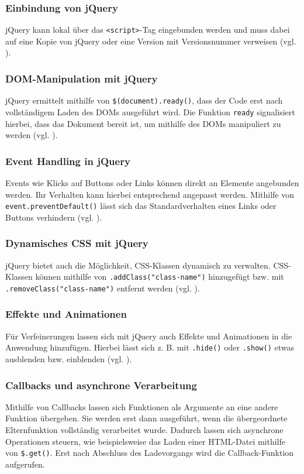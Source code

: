 \documentclass[oneside]{ausarbeitung}
\begin{document}
\subsubsection{Einbindung von jQuery}
jQuery kann lokal über das \texttt{\textless script\textgreater}-Tag eingebunden werden und muss dabei auf eine Kopie von jQuery oder eine Version mit Versionsnummer verweisen (vgl. \parencite{jquery_api}).  

\subsubsection{DOM-Manipulation mit jQuery}
jQuery ermittelt mithilfe von \texttt{\$(document).ready()}, dass der Code erst nach vollständigem Laden des DOMs ausgeführt wird. Die Funktion \texttt{ready} signalisiert hierbei, dass das Dokument bereit ist, um mithilfe des DOMs manipuliert zu werden (vgl. \parencite{jquery_api}).  

\subsubsection{Event Handling in jQuery}
Events wie Klicks auf Buttons oder Links können direkt an Elemente angebunden werden. Ihr Verhalten kann hierbei entsprechend angepasst werden. Mithilfe von  
\texttt{event.preventDefault()} lässt sich das Standardverhalten eines Links oder Buttons verhindern (vgl. \parencite{jquery_api}).  

\subsubsection{Dynamisches CSS mit jQuery}
jQuery bietet auch die Möglichkeit, CSS-Klassen dynamisch zu verwalten.  
CSS-Klassen können mithilfe von \texttt{.addClass("class-name")} hinzugefügt bzw. mit \texttt{.removeClass("class-name")} entfernt werden (vgl. \parencite{jquery_api}).  

\subsubsection{Effekte und Animationen}
Für Verfeinerungen lassen sich mit jQuery auch Effekte und Animationen in die Anwendung hinzufügen. Hierbei lässt sich z. B. mit \texttt{.hide()} oder \texttt{.show()} etwas ausblenden bzw. einblenden (vgl. \parencite{jquery_api}).  

\subsubsection{Callbacks und asynchrone Verarbeitung}
Mithilfe von Callbacks lassen sich Funktionen als Argumente an eine andere Funktion übergeben. Sie werden erst dann ausgeführt, wenn die übergeordnete Elternfunktion vollständig verarbeitet wurde. Dadurch lassen sich asynchrone Operationen steuern, wie beispielsweise das Laden einer HTML-Datei mithilfe von \texttt{\$.get()}. Erst nach Abschluss des Ladevorgangs wird die Callback-Funktion aufgerufen.  
\end{document}
